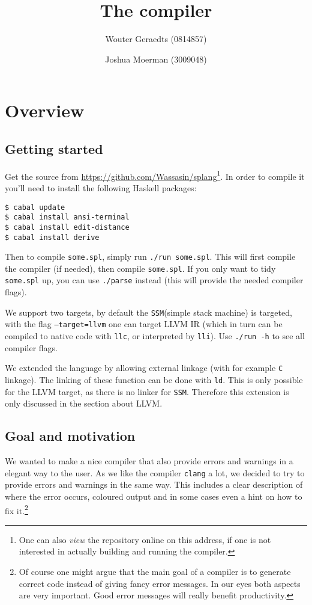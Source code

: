 \documentclass[11pt]{amsart}
\title{The \splang compiler}
\author{Wouter Geraedts (0814857) \and Joshua Moerman (3009048)}
\date{}
\newcommand{\llvm}{\textsc{LLVM}\xspace}
\newcommand{\C}{\texttt{C}\xspace}
\newcommand{\ssm}{\texttt{SSM}\xspace}
\newcommand{\flag}[1]{\texttt{#1}}
\begin{document}
\maketitle

\tableofcontents

\section{Overview}
\subsection{Getting started}
Get the source from \url{https://github.com/Wassasin/splang}\footnote{One can also \emph{view} the repository online on this address, if one is not interested in actually building and running the compiler.}. In order to compile it you'll need to install the following Haskell packages:
\begin{lstlisting}[language=term]
$ cabal update
$ cabal install ansi-terminal
$ cabal install edit-distance
$ cabal install derive
\end{lstlisting}

Then to compile \texttt{some.spl}, simply run \texttt{./run some.spl}. This will first compile the compiler (if needed), then compile \texttt{some.spl}. If you only want to tidy \texttt{some.spl} up, you can use \texttt{./parse} instead (this will provide the needed compiler flags). 

We support two targets, by default the \ssm (simple stack machine) is targeted, with the flag \flag{--target=llvm} one can target \llvm IR (which in turn can be compiled to native code with \texttt{llc}, or interpreted by \texttt{lli}). Use \texttt{./run -h} to see all compiler flags.

We extended the language by allowing external linkage (with for example \C linkage). The linking of these function can be done with \texttt{ld}. This is only possible for the \llvm target, as there is no linker for \ssm. Therefore this extension is only discussed in the section about \llvm.

\subsection{Goal and motivation}
We wanted to make a nice compiler that also provide errors and warnings in a elegant way to the user. As we like the compiler \texttt{clang} a lot, we decided to try to provide errors and warnings in the same way. This includes a clear description of where the error occurs, coloured output and in some cases even a hint on how to fix it.\footnote{Of course one might argue that the main goal of a compiler is to generate correct code instead of giving fancy error messages. In our eyes both aspects are very important. Good error messages will really benefit productivity.}
\end{document}
